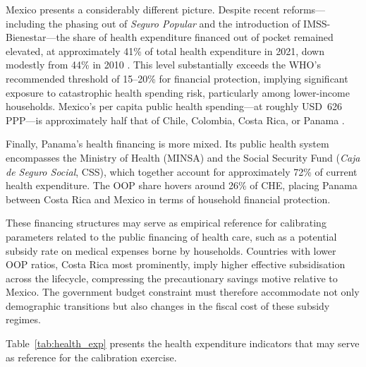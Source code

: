 \documentclass[12pt,a4paper]{article}
\begin{document}
Mexico presents a considerably different picture. Despite recent
reforms---including the phasing out of \textit{Seguro Popular} and the
introduction of IMSS-Bienestar---the share of health expenditure
financed out of pocket remained elevated, at approximately 41\% of
total health expenditure in 2021, down modestly from 44\% in 2010
\citep{WHOGHED2024}. This level substantially exceeds the WHO's
recommended threshold of 15--20\% for financial protection, implying
significant exposure to catastrophic health spending risk, particularly
among lower-income households. Mexico's per capita public health
spending---at roughly USD~626 PPP---is approximately half that of
Chile, Colombia, Costa Rica, or Panama \citep{OECDHaG2023}.

Finally, Panama's health financing is more mixed. Its public health system
encompasses the Ministry of Health (MINSA) and the Social Security Fund
(\textit{Caja de Seguro Social}, CSS), which together account for
approximately 72\% of current health expenditure. The OOP share hovers
around 26\% of CHE, placing Panama between Costa Rica and Mexico in
terms of household financial protection.

These financing structures may serve as empirical reference for
calibrating parameters related to the public financing of health care,
such as a potential subsidy rate on medical expenses borne by
households. Countries with
lower OOP ratios, Costa Rica most prominently, imply higher effective
subsidisation across the lifecycle, compressing the precautionary
savings motive relative to Mexico. The government budget constraint
must therefore accommodate not only demographic transitions but also
changes in the fiscal cost of these subsidy regimes.

Table~\ref{tab:health_exp} presents the health expenditure indicators
that may serve as reference for the calibration exercise.
\end{document}
